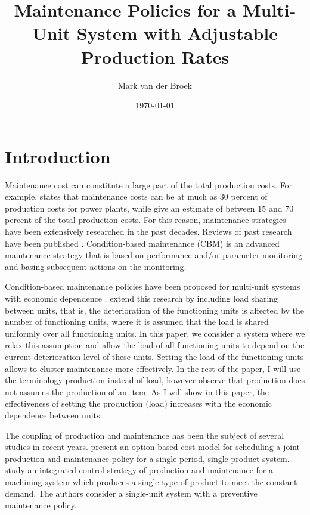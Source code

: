 \documentclass[a4paper,12pt]{article}
\title{Maintenance Policies for a Multi-Unit System with Adjustable Production Rates}
\author{Mark van der Broek}
\date{\today}
\begin{document}
	
	\maketitle

\section{Introduction}	
Maintenance cost can constitute a large part of the total production costs. For example, \cite{GRABER2004861} states that maintenance costs can be at much as 30 percent of production costs for power plants, while \cite{BEVILACQUA200071} give an estimate of between 15 and 70 percent of the total production costs. For this reason, maintenance strategies have been extensively researched in the past decades. Reviews of past research have been published \citep{VANHORENBEEK2013499, OLDEKEIZER2017405}. Condition-based maintenance (CBM) is an advanced maintenance strategy that is based on performance and/or parameter monitoring and basing subsequent actions on the monitoring. 

Condition-based maintenance policies have been proposed for multi-unit systems with economic dependence \citep{OLDEKEIZER2016531}. \cite{OLDEKEIZER2018319} extend this research by including load sharing between units, that is, the deterioration of the functioning units is affected by the number of functioning units, where it is assumed that the load is shared uniformly over all functioning units. In this paper, we consider a system where we relax this assumption and allow the load of all functioning units to depend on the current deterioration level of these units. Setting the load of the functioning units allows to cluster maintenance more effectively. In the rest of the paper, I will use the terminology production instead of load, however observe that production does not assumes the production of an item. As I will show in this paper, the effectiveness of setting the production (load) increases with the economic dependence between units. 

The coupling of production and maintenance has been the subject of several studies in recent years. \cite{doi:10.1080/00207543.2013.843037} present an option-based cost model for scheduling a joint production and maintenance policy for a single-period, single-product system. \cite{doi:10.1080/00207543.2016.1174343}  study an integrated control strategy of production and maintenance for a machining system which produces a single type of product to meet the constant demand. The authors consider a single-unit system with a preventive maintenance policy. 
\end{document}
